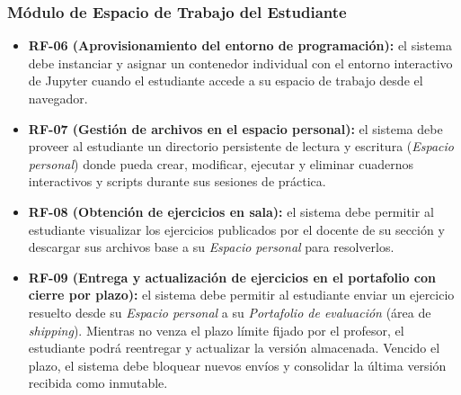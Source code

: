 \subsubsection{Módulo de Espacio de Trabajo del Estudiante}
\begin{itemize}
    \item \textbf{RF-06 (Aprovisionamiento del entorno de programación):} el sistema debe instanciar y asignar un contenedor individual con el entorno interactivo de Jupyter cuando el estudiante accede a su espacio de trabajo desde el navegador.
    \item \textbf{RF-07 (Gestión de archivos en el espacio personal):} el sistema debe proveer al estudiante un directorio persistente de lectura y escritura (\textit{Espacio personal}) donde pueda crear, modificar, ejecutar y eliminar cuadernos interactivos y scripts durante sus sesiones de práctica.
    \item \textbf{RF-08 (Obtención de ejercicios en sala):} el sistema debe permitir al estudiante visualizar los ejercicios publicados por el docente de su sección y descargar sus archivos base a su \textit{Espacio personal} para resolverlos.
    \item \textbf{RF-09 (Entrega y actualización de ejercicios en el portafolio con cierre por plazo):} el sistema debe permitir al estudiante enviar un ejercicio resuelto desde su \textit{Espacio personal} a su \textit{Portafolio de evaluación} (área de \textit{shipping}). Mientras no venza el plazo límite fijado por el profesor, el estudiante podrá reentregar y actualizar la versión almacenada. Vencido el plazo, el sistema debe bloquear nuevos envíos y consolidar la última versión recibida como inmutable.
\end{itemize}

